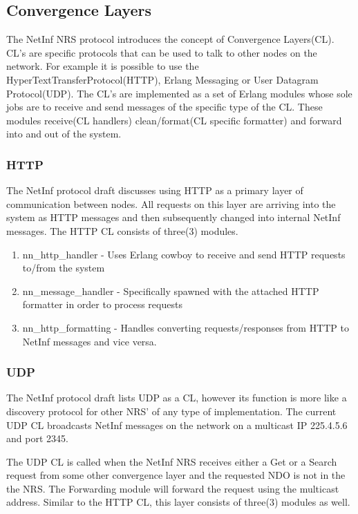 \subsection {Convergence Layers}
\label{CL}
The NetInf NRS protocol introduces the concept of Convergence Layers(CL). CL's are specific protocols that can be used to talk to other nodes on the network. For example it is possible to use the HyperTextTransferProtocol(HTTP), Erlang Messaging or User Datagram Protocol(UDP). The CL's are implemented as a set of Erlang modules whose sole jobs are to receive and send messages of the specific type of the CL. These modules receive(CL handlers) clean/format(CL specific formatter) and forward into and out of the system.

\subsubsection{HTTP}

The NetInf protocol draft discusses using HTTP as a primary layer of communication between nodes. All requests on this layer are arriving into the system as HTTP messages and then subsequently changed into internal NetInf messages. The HTTP CL consists of three(3) modules. 

\begin{enumerate}
\item nn\_http\_handler - Uses Erlang cowboy to receive and send HTTP requests to/from the system
\item nn\_message\_handler - Specifically spawned with the attached HTTP formatter in order to process requests
\item nn\_http\_formatting - Handles converting requests/responses from HTTP to NetInf messages and vice versa.
\end{enumerate}

\subsubsection{UDP}

The NetInf protocol draft lists UDP as a CL, however its function is more like a discovery protocol for other NRS' of any type of implementation. The current UDP CL broadcasts NetInf messages on the network on a multicast IP 225.4.5.6 and port 2345. 

The UDP CL is called when the NetInf NRS receives either a Get or a Search request from some other convergence layer and the requested NDO is not in the the NRS. The Forwarding module will forward the request using the multicast address. Similar to the HTTP CL, this layer consists of three(3) modules as well. 

